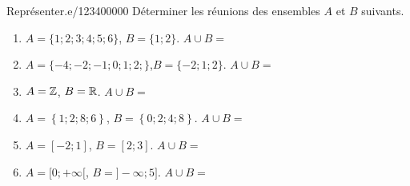 \begin{pageAD}
\begin{ExoCad}{Représenter.}{e/1234}{0}{0}{0}{0}{0}
Déterminer les réunions des ensembles $A$ et $B$ suivants. 
\begin{enumerate}
\item $A = \lbrace 1;2;3;4;5;6\rbrace$, $B = \lbrace 1;2 \rbrace$. $A \cup B = $
\item $A = \lbrace -4;-2;-1;0;1;2;\rbrace$,$B = \lbrace -2;1;2 \rbrace$.  $A \cup B = $
\item $A=\mathbb Z$, $B =\mathbb R$. $A \cup B = $ 
\item $A=\left\lbrace 1;2;8;6  \right\rbrace $, $B =\left\lbrace 0;2;4;8  \right\rbrace $. $A \cup B = $ 
\item $A=[-2;1]$, $B =[2;3]$. $A \cup B = $ 
\item $A=[0;+\infty[$, $B =]-\infty;5]$. $A \cup B = $ 
\end{enumerate} 
\end{ExoCad}

\end{pageAD} %


